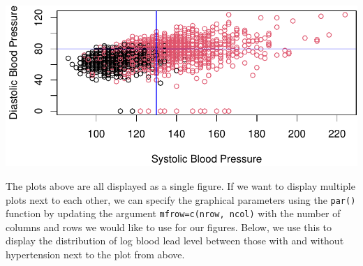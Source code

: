 \documentclass[
  letterpaper,
]{krantz}
\makeatletter
\newenvironment{Shaded}{\begin{snugshade}}{\end{snugshade}}
\newcommand{\AttributeTok}[1]{\textcolor[rgb]{0.40,0.45,0.13}{#1}}
\newcommand{\CommentTok}[1]{\textcolor[rgb]{0.37,0.37,0.37}{#1}}
\newcommand{\DecValTok}[1]{\textcolor[rgb]{0.68,0.00,0.00}{#1}}
\newcommand{\FunctionTok}[1]{\textcolor[rgb]{0.28,0.35,0.67}{#1}}
\newcommand{\NormalTok}[1]{\textcolor[rgb]{0.00,0.23,0.31}{#1}}
\newcommand{\SpecialCharTok}[1]{\textcolor[rgb]{0.37,0.37,0.37}{#1}}
\newcommand{\StringTok}[1]{\textcolor[rgb]{0.13,0.47,0.30}{#1}}
\newenvironment{kframe}{%
\medskip{}
\setlength{\fboxsep}{.8em}
 \def\at@end@of@kframe{}%
 \ifinner\ifhmode%
  \def\at@end@of@kframe{\end{minipage}}%
  \begin{minipage}{\columnwidth}%
 \fi\fi%
 \def\FrameCommand##1{\hskip\@totalleftmargin \hskip-\fboxsep
 \colorbox{shadecolor}{##1}\hskip-\fboxsep
     \hskip-\linewidth \hskip-\@totalleftmargin \hskip\columnwidth}%
 \MakeFramed {\advance\hsize-\width
   \@totalleftmargin\z@ \linewidth\hsize
   \@setminipage}}%
 {\par\unskip\endMakeFramed%
 \at@end@of@kframe}
\renewenvironment{Shaded}{\begin{kframe}}{\end{kframe}}
\makeatother
\begin{document}
\begin{center}
\includegraphics[width=1\textwidth,height=\textheight]{book/exploratory_analysis_files/figure-pdf/unnamed-chunk-19-1.pdf}
\end{center}

The plots above are all displayed as a single figure. If we want to
display multiple plots next to each other, we can specify the graphical
parameters using the \texttt{par()} function by updating the argument
\texttt{mfrow=c(nrow,\ ncol)} with the number of columns and rows we
would like to use for our figures. Below, we use this to display the
distribution of log blood lead level between those with and without
hypertension next to the plot from above.

\begin{Shaded}
\end{Shaded}
\end{document}
